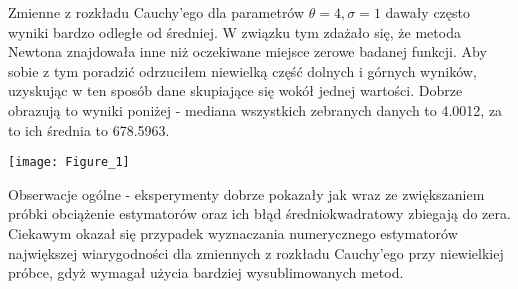 \documentclass[a4paper]{article}
\begin{document}
Zmienne z rozkładu Cauchy'ego dla parametrów $\theta=4,\sigma=1$ dawały często wyniki bardzo odległe od średniej. W związku tym zdażało się, że metoda Newtona znajdowała inne niż oczekiwane miejsce zerowe badanej funkcji. Aby sobie z tym poradzić odrzuciłem niewielką część dolnych i górnych wyników, uzyskując w ten sposób dane skupiające się wokół jednej wartości. Dobrze obrazują to wyniki poniżej - mediana wszystkich zebranych danych to 4.0012, za to ich średnia to 678.5963.

\begin{center}
\texttt{[image: Figure\_1]}\\
\end{center}



Obserwacje ogólne - eksperymenty dobrze pokazały jak wraz ze zwiększaniem próbki obciążenie estymatorów oraz ich błąd średniokwadratowy zbiegają do zera. Ciekawym okazał się przypadek wyznaczania numerycznego estymatorów największej wiarygodności dla zmiennych z rozkładu Cauchy'ego przy niewielkiej próbce, gdyż wymagał użycia bardziej wysublimowanych metod.
\end{document}
